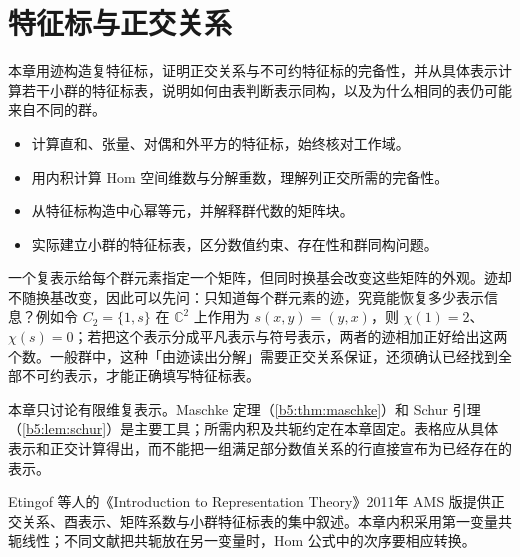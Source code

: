 

\chapter{特征标与正交关系}
\label{b5:ch:02}

\begin{chapterabstract}
	本章用迹构造复特征标，证明正交关系与不可约特征标的完备性，并从具体表示计算若干小群的特征标表，说明如何由表判断表示同构，以及为什么相同的表仍可能来自不同的群。
\end{chapterabstract}

\begin{learninggoals}
	\begin{itemize}
		\item 计算直和、张量、对偶和外平方的特征标，始终核对工作域。
		\item 用内积计算 Hom 空间维数与分解重数，理解列正交所需的完备性。
		\item 从特征标构造中心幂等元，并解释群代数的矩阵块。
		\item 实际建立小群的特征标表，区分数值约束、存在性和群同构问题。
	\end{itemize}
\end{learninggoals}

一个复表示给每个群元素指定一个矩阵，但同时换基会改变这些矩阵的外观。迹却不随换基改变，因此可以先问：只知道每个群元素的迹，究竟能恢复多少表示信息？例如令 \(C_2=\{1,s\}\) 在 \(\mathbb C^2\) 上作用为 \(s(x,y)=(y,x)\)，则 \(\chi(1)=2\)、\(\chi(s)=0\)；若把这个表示分成平凡表示与符号表示，两者的迹相加正好给出这两个数。一般群中，这种「由迹读出分解」需要正交关系保证，还须确认已经找到全部不可约表示，才能正确填写特征标表。

\ProseParagraphBreak
本章只讨论有限维复表示。Maschke 定理（\cref{b5:thm:maschke}）和 Schur 引理（\cref{b5:lem:schur}）是主要工具；所需内积及共轭约定在本章固定。表格应从具体表示和正交计算得出，而不能把一组满足部分数值关系的行直接宣布为已经存在的表示。

\ProseParagraphBreak
Etingof 等人的《Introduction to Representation Theory》2011年 AMS 版\cite[Sections 4.5--4.8, pp. 65--75]{EtingofEtAl2011RepresentationTheory}提供正交关系、酉表示、矩阵系数与小群特征标表的集中叙述。本章内积采用第一变量共轭线性；不同文献把共轭放在另一变量时，Hom 公式中的次序要相应转换。






